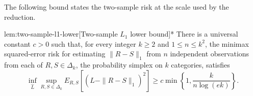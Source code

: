 \documentclass[11pt]{article}
\begin{document}
The following bound states the two-sample risk at the scale used by the reduction.

\begin{lemmav}{lem:two-sample-l1-lower}[Two-sample \(L_1\) lower bound]*
There is a universal constant \(c>0\) such that, for every integer \(k\geq 2\) and \(1\leq n\leq k^2\), the minimax squared-error risk for estimating \(\|R-S\|_1\) from \(n\) independent observations from each of \(R,S\in\Delta_k\), the probability simplex on \(k\) categories, satisfies
\[
\inf_{\widehat L}\sup_{R,S\in\Delta_k}
E_{R,S}\!\left[(\widehat L-\|R-S\|_1)^2\right]
\geq c\min\left\{1,\frac{k}{n\log(ek)}\right\}.
\]
\end{lemmav}
\end{document}
